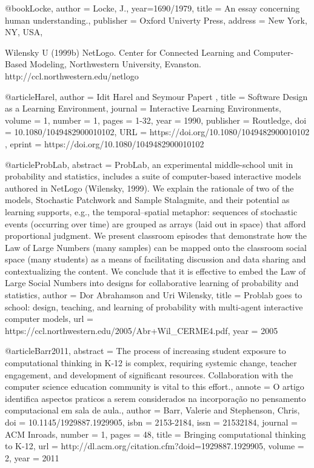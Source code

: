 

@book{Locke,
	author = {Locke, J.},
	year={1690/1979},
	title = {An essay concerning human understanding.},
	publisher = {Oxford Univerty Press},
	address = {New York, NY, USA},
}

Wilensky U (1999b) NetLogo. Center for Connected Learning and Computer-Based Modeling, Northwestern University, Evanston. http://ccl.northwestern.edu/netlogo

@article{Harel,
	author = { Idit   Harel  and  Seymour   Papert },
	title = {Software Design as a Learning Environment},
	journal = {Interactive Learning Environments},
	volume = {1},
	number = {1},
	pages = {1-32},
	year  = {1990},
	publisher = {Routledge},
	doi = {10.1080/1049482900010102},
	URL = { 
		https://doi.org/10.1080/1049482900010102
	},
	eprint = { 
		https://doi.org/10.1080/1049482900010102
	}
}

@article{ProbLab,
abstract = {ProbLab, an experimental middle-school unit in probability and statistics, includes a
suite of computer-based interactive models authored in NetLogo (Wilensky, 1999). We
explain the rationale of two of the models, Stochastic Patchwork and Sample Stalagmite,
and their potential as learning supports, e.g., the temporal–spatial metaphor: sequences
of stochastic events (occurring over time) are grouped as arrays (laid out in space) that
afford proportional judgment. We present classroom episodes that demonstrate how the
Law of Large Numbers (many samples) can be mapped onto the classroom social space
(many students) as a means of facilitating discussion and data sharing and
contextualizing the content. We conclude that it is effective to embed the Law of Large
Social Numbers into designs for collaborative learning of probability and statistics},
author = {Dor Abrahamson and Uri Wilensky},
title = {{ Problab goes to school: design, teaching, and
learning of probability with multi-agent
interactive computer models}},
url = {https://ccl.northwestern.edu/2005/Abr+Wil_CERME4.pdf},
year = {2005}
}

@article{Barr2011,
abstract = {The process of increasing student exposure to computational thinking in K-12 is complex, requiring systemic change, teacher engagement, and development of significant resources. Collaboration with the computer science education community is vital to this effort.},
annote = {O artigo identifica aspectos praticos a serem considerados na incorpora{\c{c}}{\~{a}}o no pensamento computacional em sala de aula.},
author = {Barr, Valerie and Stephenson, Chris},
doi = {10.1145/1929887.1929905},
isbn = {2153-2184},
issn = {21532184},
journal = {ACM Inroads},
number = {1},
pages = {48},
title = {{Bringing computational thinking to K-12}},
url = {http://dl.acm.org/citation.cfm?doid=1929887.1929905},
volume = {2},
year = {2011}
}

